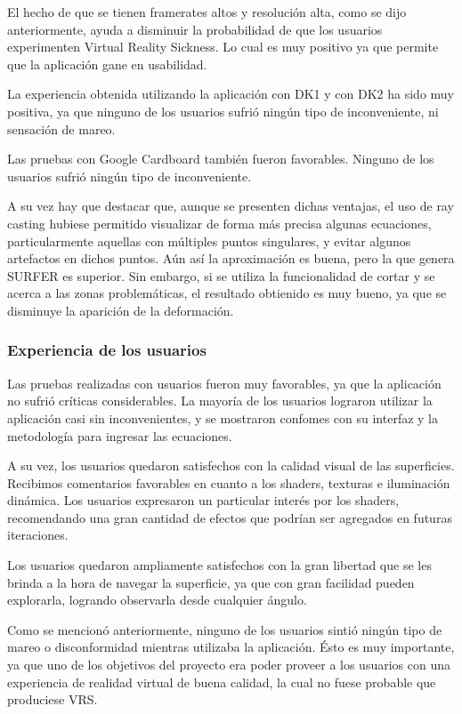 \documentclass[12pt]{article}
\begin{document}
El hecho de que se tienen framerates altos y resolución alta, como se dijo anteriormente, ayuda a disminuir la probabilidad de que los usuarios experimenten Virtual Reality Sickness. Lo cual es muy positivo ya que permite que la aplicación gane en usabilidad.

La experiencia obtenida utilizando la aplicación con DK1 y con DK2 ha sido muy positiva, ya que ninguno de los usuarios sufrió ningún tipo de inconveniente, ni sensación de mareo. 

Las pruebas con Google Cardboard también fueron favorables. Ninguno de los usuarios sufrió ningún tipo de inconveniente.

A su vez hay que destacar que, aunque se presenten dichas ventajas, el uso de ray casting hubiese permitido visualizar de forma más precisa algunas ecuaciones, particularmente aquellas con múltiples puntos singulares, y evitar algunos artefactos en dichos puntos. Aún así la aproximación es buena, pero la que genera SURFER es superior. Sin embargo, si se utiliza la funcionalidad de cortar y se acerca a las zonas problemáticas, el resultado obtienido es muy bueno, ya que se disminuye la aparición de la deformación.

\subsubsection{Experiencia de los usuarios}
\noindent Las pruebas realizadas con usuarios fueron muy favorables, ya que la aplicación no sufrió críticas considerables. La mayoría de los usuarios lograron utilizar la aplicación casi sin inconvenientes, y se mostraron confomes con su interfaz y la metodología para ingresar las ecuaciones.

A su vez, los usuarios quedaron satisfechos con la calidad visual de las superficies. Recibimos comentarios favorables en cuanto a los shaders, texturas e iluminación dinámica. Los usuarios expresaron un particular interés por los shaders, recomendando una gran cantidad de efectos que podrían ser agregados en futuras iteraciones. 

Los usuarios quedaron ampliamente satisfechos con la gran libertad que se les brinda a la hora de navegar la superficie, ya que con gran facilidad pueden explorarla, logrando observarla desde cualquier ángulo.

Como se mencionó anteriormente, ninguno de los usuarios sintió ningún tipo de mareo o disconformidad mientras utilizaba la aplicación. Ésto es muy importante, ya que uno de los objetivos del proyecto era poder proveer a los usuarios con una experiencia de realidad virtual de buena calidad, la cual no fuese probable que produciese VRS. 
\end{document}
